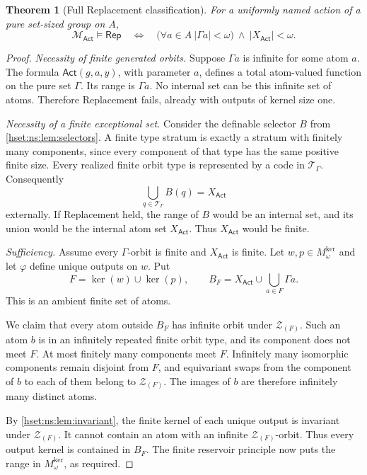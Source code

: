 \documentclass[11pt,letterpaper]{article}
\newtheorem{theorem}{Theorem}[section]
\theoremstyle{definition}
\theoremstyle{remark}
\newcommand{\kerat}{\operatorname{ker}}
\newcommand{\Mker}{M^{\mathrm{ker}}}
\newcommand{\Act}{\mathsf{Act}}
\newcommand{\MAct}{\mathcal M_{\Act}}
\newcommand{\Rep}{\mathsf{Rep}}
\newcommand{\abs}[1]{\lvert #1\rvert}
\newcommand{\calT}{\mathcal T_{\Gamma}}
\begin{document}
\begin{theorem}[Full Replacement classification]\label{hset:ns:thm:full}
For a uniformly named action of a pure set-sized group on $A$,
\[
 \boxed{\quad
 \MAct\models\Rep
 \quad\Longleftrightarrow\quad
 \bigl(\forall a\in A\ \abs{\Gamma a}<\omega\bigr)
 \ \land\ \abs{X_{\Act}}<\omega.
 \quad}
\]
\end{theorem}
\begin{proof}
\emph{Necessity of finite generated orbits.}
Suppose $\Gamma a$ is infinite for some atom $a$. The formula $\Act(g,a,y)$, with parameter $a$, defines a total atom-valued function on the pure set $\Gamma$. Its range is $\Gamma a$. No internal set can be this infinite set of atoms. Therefore Replacement fails, already with outputs of kernel size one.

\emph{Necessity of a finite exceptional set.}
Consider the definable selector $B$ from \cref{hset:ns:lem:selectors}. A finite type stratum is exactly a stratum with finitely many components, since every component of that type has the same positive finite size. Every realized finite orbit type is represented by a code in $\calT$. Consequently
\[
 \bigcup_{q\in\calT}B(q)=X_{\Act}
\]
externally. If Replacement held, the range of $B$ would be an internal set, and its union would be the internal atom set $X_{\Act}$. Thus $X_{\Act}$ would be finite.

\emph{Sufficiency.}
Assume every $\Gamma$-orbit is finite and $X_{\Act}$ is finite. Let $w,p\in \Mker_\omega$ and let $\varphi$ define unique outputs on $w$. Put
\[
 F=\kerat(w)\cup\kerat(p),\qquad
 B_F=X_{\Act}\cup\bigcup_{a\in F}\Gamma a.
\]
This is an ambient finite set of atoms.

We claim that every atom outside $B_F$ has infinite orbit under $\mathcal Z_{(F)}$. Such an atom $b$ is in an infinitely repeated finite orbit type, and its component does not meet $F$. At most finitely many components meet $F$. Infinitely many isomorphic components remain disjoint from $F$, and equivariant swaps from the component of $b$ to each of them belong to $\mathcal Z_{(F)}$. The images of $b$ are therefore infinitely many distinct atoms.

By \cref{hset:ns:lem:invariant}, the finite kernel of each unique output is invariant under $\mathcal Z_{(F)}$. It cannot contain an atom with an infinite $\mathcal Z_{(F)}$-orbit. Thus every output kernel is contained in $B_F$. The finite reservoir principle now puts the range in $\Mker_\omega$, as required.
\end{proof}
\end{document}
